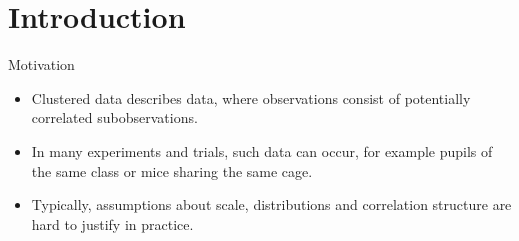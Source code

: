 \documentclass[xcolor=dvipsnames, aspectratio = 169]{beamer}
\begin{document}
\section{Introduction}
\begin{frame}[fragile]{Motivation}
  \begin{itemize}
  \item Clustered data describes data, where observations consist of potentially correlated subobservations.
  \item In many experiments and trials, such data can occur, for example pupils of the same class or mice sharing the same cage. 
  \item Typically, assumptions about scale, distributions and correlation structure are hard to justify in practice.
  \end{itemize}
\end{frame}
\end{document}
